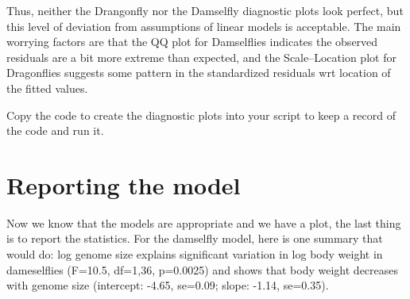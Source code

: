 Thus, neither the Drangonfly nor the Damselfly diagnostic plots look 
perfect, but this level of deviation from assumptions of linear models 
is acceptable. The main worrying factors are that the QQ plot for 
Damselflies indicates the observed residuals are a bit more extreme 
than expected, and the Scale--Location plot for Dragonflies suggests 
some pattern in the standardized residuals wrt location of the fitted 
values.

\begin{compactitem}[$\quad\star$]
 \item Copy the code to create the diagnostic plots into your script to 
 keep a record of the code and run it.
\end{compactitem}

\section{Reporting the model}

Now we know that the models are appropriate and we have a plot, the 
last thing is to report the statistics. For the damselfly model, here 
is one summary that would do: log genome size explains significant 
variation in log body weight in dameselflies (F=10.5, df=1,36, p=0.0025) 
and shows that body weight decreases with genome size (intercept: 
-4.65,  se=0.09; slope: -1.14, se=0.35).
